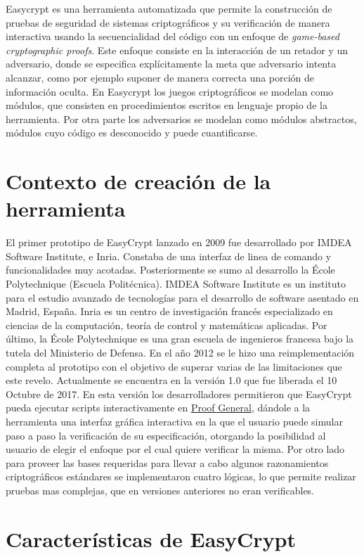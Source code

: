 \documentclass[runningheads]{llncs}
\begin{document}
Easycrypt es una herramienta automatizada que permite la construcción de pruebas de seguridad de sistemas criptográficos y su verificación de manera interactiva usando la secuencialidad del código con un enfoque de \textit{game-based cryptographic proofs}. Este enfoque consiste en la interacción de un retador y un adversario, donde se especifica explícitamente la meta que adversario intenta alcanzar, como por ejemplo suponer de manera correcta una porción de información oculta. En Easycrypt los juegos criptográficos se modelan como módulos, que consisten en procedimientos escritos en lenguaje propio de la herramienta. Por otra parte los adversarios se modelan como módulos abstractos, módulos cuyo código es desconocido y puede cuantificarse.

\section{Contexto de creación de la herramienta}
El primer prototipo de EasyCrypt lanzado en 2009 fue desarrollado por IMDEA Software Institute, e Inria. Constaba de una interfaz de linea 	de comando y funcionalidades muy acotadas. Posteriormente se sumo al desarrollo la École Polytechnique (Escuela Politécnica). IMDEA Software Institute es un instituto para el estudio avanzado de tecnologías para el desarrollo de software asentado en Madrid, España. Inria es un centro de investigación francés especializado en ciencias de la computación, teoría de control y matemáticas aplicadas. Por último, la École Polytechnique es una gran escuela de ingenieros francesa bajo la tutela del Ministerio de Defensa. En el año 2012 se le hizo una reimplementación completa al prototipo con el objetivo de superar varias de las limitaciones que este revelo. Actualmente se encuentra en la versión 1.0 que fue liberada el 10 Octubre de 2017. En esta versión los desarrolladores permitieron que EasyCrypt pueda ejecutar scripts interactivamente en \href{https://proofgeneral.github.io}{Proof General}, dándole a la herramienta una interfaz gráfica interactiva en la que el usuario puede simular paso a paso la verificación de su especificación, otorgando la posibilidad al usuario de elegir el enfoque por el cual quiere verificar la misma. Por otro lado para proveer las bases requeridas para llevar a cabo algunos razonamientos criptográficos estándares se implementaron cuatro lógicas, lo que permite realizar pruebas mas complejas, que en versiones anteriores no eran verificables.

\section{Características de EasyCrypt}
\end{document}
